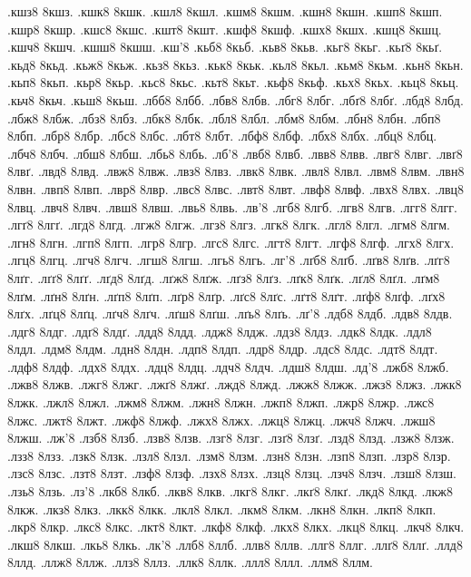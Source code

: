{.кшз8 8кшз.
.кшк8 8кшк.
.кшл8 8кшл.
.кшм8 8кшм.
.кшн8 8кшн.
.кшп8 8кшп.
.кшр8 8кшр.
.кшс8 8кшс.
.кшт8 8кшт.
.кшф8 8кшф.
.кшх8 8кшх.
.кшц8 8кшц.
.кшч8 8кшч.
.кшш8 8кшш.
.кш'8
.кьб8 8кьб.
.кьв8 8кьв.
.кьг8 8кьг.
.кьґ8 8кьґ.
.кьд8 8кьд.
.кьж8 8кьж.
.кьз8 8кьз.
.кьк8 8кьк.
.кьл8 8кьл.
.кьм8 8кьм.
.кьн8 8кьн.
.кьп8 8кьп.
.кьр8 8кьр.
.кьс8 8кьс.
.кьт8 8кьт.
.кьф8 8кьф.
.кьх8 8кьх.
.кьц8 8кьц.
.кьч8 8кьч.
.кьш8 8кьш.
.лбб8 8лбб.
.лбв8 8лбв.
.лбг8 8лбг.
.лбґ8 8лбґ.
.лбд8 8лбд.
.лбж8 8лбж.
.лбз8 8лбз.
.лбк8 8лбк.
.лбл8 8лбл.
.лбм8 8лбм.
.лбн8 8лбн.
.лбп8 8лбп.
.лбр8 8лбр.
.лбс8 8лбс.
.лбт8 8лбт.
.лбф8 8лбф.
.лбх8 8лбх.
.лбц8 8лбц.
.лбч8 8лбч.
.лбш8 8лбш.
.лбь8 8лбь.
.лб'8
.лвб8 8лвб.
.лвв8 8лвв.
.лвг8 8лвг.
.лвґ8 8лвґ.
.лвд8 8лвд.
.лвж8 8лвж.
.лвз8 8лвз.
.лвк8 8лвк.
.лвл8 8лвл.
.лвм8 8лвм.
.лвн8 8лвн.
.лвп8 8лвп.
.лвр8 8лвр.
.лвс8 8лвс.
.лвт8 8лвт.
.лвф8 8лвф.
.лвх8 8лвх.
.лвц8 8лвц.
.лвч8 8лвч.
.лвш8 8лвш.
.лвь8 8лвь.
.лв'8
.лгб8 8лгб.
.лгв8 8лгв.
.лгг8 8лгг.
.лгґ8 8лгґ.
.лгд8 8лгд.
.лгж8 8лгж.
.лгз8 8лгз.
.лгк8 8лгк.
.лгл8 8лгл.
.лгм8 8лгм.
.лгн8 8лгн.
.лгп8 8лгп.
.лгр8 8лгр.
.лгс8 8лгс.
.лгт8 8лгт.
.лгф8 8лгф.
.лгх8 8лгх.
.лгц8 8лгц.
.лгч8 8лгч.
.лгш8 8лгш.
.лгь8 8лгь.
.лг'8
.лґб8 8лґб.
.лґв8 8лґв.
.лґг8 8лґг.
.лґґ8 8лґґ.
.лґд8 8лґд.
.лґж8 8лґж.
.лґз8 8лґз.
.лґк8 8лґк.
.лґл8 8лґл.
.лґм8 8лґм.
.лґн8 8лґн.
.лґп8 8лґп.
.лґр8 8лґр.
.лґс8 8лґс.
.лґт8 8лґт.
.лґф8 8лґф.
.лґх8 8лґх.
.лґц8 8лґц.
.лґч8 8лґч.
.лґш8 8лґш.
.лґь8 8лґь.
.лґ'8
.лдб8 8лдб.
.лдв8 8лдв.
.лдг8 8лдг.
.лдґ8 8лдґ.
.лдд8 8лдд.
.лдж8 8лдж.
.лдз8 8лдз.
.лдк8 8лдк.
.лдл8 8лдл.
.лдм8 8лдм.
.лдн8 8лдн.
.лдп8 8лдп.
.лдр8 8лдр.
.лдс8 8лдс.
.лдт8 8лдт.
.лдф8 8лдф.
.лдх8 8лдх.
.лдц8 8лдц.
.лдч8 8лдч.
.лдш8 8лдш.
.лд'8
.лжб8 8лжб.
.лжв8 8лжв.
.лжг8 8лжг.
.лжґ8 8лжґ.
.лжд8 8лжд.
.лжж8 8лжж.
.лжз8 8лжз.
.лжк8 8лжк.
.лжл8 8лжл.
.лжм8 8лжм.
.лжн8 8лжн.
.лжп8 8лжп.
.лжр8 8лжр.
.лжс8 8лжс.
.лжт8 8лжт.
.лжф8 8лжф.
.лжх8 8лжх.
.лжц8 8лжц.
.лжч8 8лжч.
.лжш8 8лжш.
.лж'8
.лзб8 8лзб.
.лзв8 8лзв.
.лзг8 8лзг.
.лзґ8 8лзґ.
.лзд8 8лзд.
.лзж8 8лзж.
.лзз8 8лзз.
.лзк8 8лзк.
.лзл8 8лзл.
.лзм8 8лзм.
.лзн8 8лзн.
.лзп8 8лзп.
.лзр8 8лзр.
.лзс8 8лзс.
.лзт8 8лзт.
.лзф8 8лзф.
.лзх8 8лзх.
.лзц8 8лзц.
.лзч8 8лзч.
.лзш8 8лзш.
.лзь8 8лзь.
.лз'8
.лкб8 8лкб.
.лкв8 8лкв.
.лкг8 8лкг.
.лкґ8 8лкґ.
.лкд8 8лкд.
.лкж8 8лкж.
.лкз8 8лкз.
.лкк8 8лкк.
.лкл8 8лкл.
.лкм8 8лкм.
.лкн8 8лкн.
.лкп8 8лкп.
.лкр8 8лкр.
.лкс8 8лкс.
.лкт8 8лкт.
.лкф8 8лкф.
.лкх8 8лкх.
.лкц8 8лкц.
.лкч8 8лкч.
.лкш8 8лкш.
.лкь8 8лкь.
.лк'8
.ллб8 8ллб.
.ллв8 8ллв.
.ллг8 8ллг.
.ллґ8 8ллґ.
.ллд8 8ллд.
.ллж8 8ллж.
.ллз8 8ллз.
.ллк8 8ллк.
.ллл8 8ллл.
.ллм8 8ллм.
}
